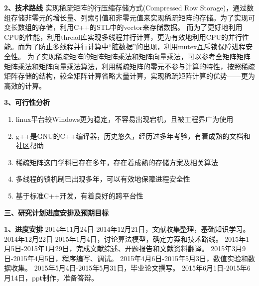 \documentclass{article}
\begin{document}
     \textbf{2、技术路线} \qquad
\newline
实现稀疏矩阵的行压缩存储方式(Compressed Row Storage)，通过数组存储非零元的增长量、列索引值和非零元值来实现稀疏矩阵的存储。为了实现可变长数组的存储，利用C++的STL中的vector来存储数据。
\newline
而为了更好地利用CPU的性能，利用thread库实现多线程并行计算，更为有效地利用CPU的并行性能。而为了防止多线程并行计算中“脏数据”的出现，利用mutex互斥锁保障进程安全性。
\newline
为了实现稀疏矩阵的矩阵矩阵乘法和矩阵向量乘法，可以参考全矩阵矩阵矩阵乘法和矩阵向量乘法算法，利用稀疏矩阵的零元不参与计算的特性，按照稀疏矩阵存储的结构，较全矩阵计算省略大量计算，实现稀疏矩阵计算的优势——更为高效的计算。
\newline
	

     \textbf{3、可行性分析}
     \begin{enumerate}[1]
\item 	linux平台较Windows更为稳定，不容易出现宕机，且被工程界广为使用
\item 	g++是GNU的C++编译器，历史悠久，经历过多年考验，有着成熟的文档和社区帮助
\item		稀疏矩阵这门学科已存在多年，存在着成熟的存储方案及相关算法
\item		多线程的锁机制已出现多年，可以有效地保障进程安全性
\item		基于标准C++开发，有着良好的跨平台性

\end{enumerate}


\textbf{三、研究计划进度安排及预期目标}
      \qquad
\newline
 

     \textbf{1、进度安排}\qquad \newline
     2014年11月24日-2014年12月21日，文献收集整理，基础知识学习。\newline
2014年12月22日-2015年1月4日，讨论算法模型，确定方案和技术路线。\newline
2015年1月5日-2015年1月29日，完成文献综述、开题报告和文献资料翻译。\newline
2015年3月9日-2015年4月5日，程序编写、调试。\newline
2015年4月6日-2015年5月3日，数值实验和数据收集。\newline
2015年5月4日-2015年5月31日，毕业论文撰写。\newline
2015年6月1日-2015年6月14日，ppt制作，准备答辩。
\newline
\end{document}
